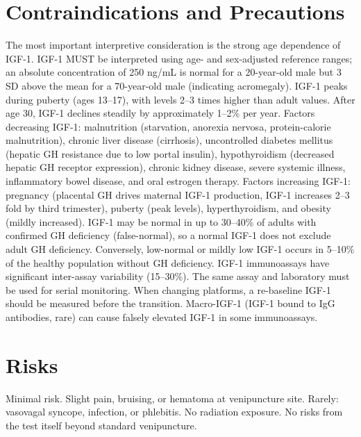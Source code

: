 \section*{Contraindications and Precautions}
The most important interpretive consideration is the strong age dependence of IGF-1. IGF-1 MUST be interpreted using age- and sex-adjusted reference ranges; an absolute concentration of 250 ng/mL is normal for a 20-year-old male but 3 SD above the mean for a 70-year-old male (indicating acromegaly). IGF-1 peaks during puberty (ages 13--17), with levels 2--3 times higher than adult values. After age 30, IGF-1 declines steadily by approximately 1--2\% per year. Factors decreasing IGF-1: malnutrition (starvation, anorexia nervosa, protein-calorie malnutrition), chronic liver disease (cirrhosis), uncontrolled diabetes mellitus (hepatic GH resistance due to low portal insulin), hypothyroidism (decreased hepatic GH receptor expression), chronic kidney disease, severe systemic illness, inflammatory bowel disease, and oral estrogen therapy. Factors increasing IGF-1: pregnancy (placental GH drives maternal IGF-1 production, IGF-1 increases 2--3 fold by third trimester), puberty (peak levels), hyperthyroidism, and obesity (mildly increased). IGF-1 may be normal in up to 30--40\% of adults with confirmed GH deficiency (false-normal), so a normal IGF-1 does not exclude adult GH deficiency. Conversely, low-normal or mildly low IGF-1 occurs in 5--10\% of the healthy population without GH deficiency. IGF-1 immunoassays have significant inter-assay variability (15--30\%). The same assay and laboratory must be used for serial monitoring. When changing platforms, a re-baseline IGF-1 should be measured before the transition. Macro-IGF-1 (IGF-1 bound to IgG antibodies, rare) can cause falsely elevated IGF-1 in some immunoassays.

\section*{Risks}
Minimal risk. Slight pain, bruising, or hematoma at venipuncture site. Rarely: vasovagal syncope, infection, or phlebitis. No radiation exposure. No risks from the test itself beyond standard venipuncture.

